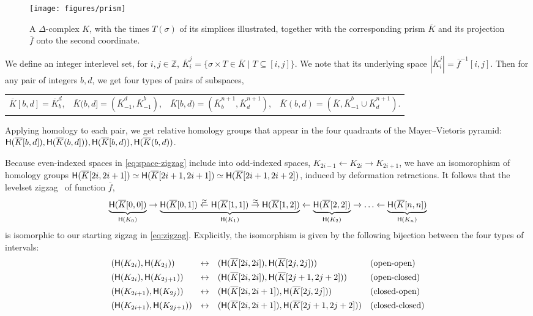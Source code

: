 \documentclass[cleveref,a4paper,english,nolineno]{socg-lipics-v2021}
\newcommand{\Zsp}{\mathbb{Z}}
\newcommand{\ot}{\leftarrow}
\newcommand{\Hgr}{{\sf H}}
\newcommand{\prism}[1]{\overline{#1}}
\newcommand{\pK}{\prism{K}}
\newcommand{\pf}{\prism{f}}
\newcommand{\ssx}{\sigma}
\begin{document}
\begin{figure}
    \centering
    \texttt{[image: figures/prism]}
    \caption{A $\Delta$-complex $K$, with the times $T(\ssx)$ of its simplices
             illustrated, together with the corresponding prism $\pK$ and its
             projection $\pf$ onto the second coordinate.}
    \label{fig:prism}
\end{figure}

We define an integer interlevel set, for $i,j \in \Zsp$,
$
    \pK_i^j = \{ \ssx \times T \in \pK \mid T \subseteq [i, j] \}.
$
We note that its underlying space $|\pK_i^j| = \pf^{-1}[i,j]$.
Then for any pair of integers $b,d$, we get four types of pairs of subspaces,

\hspace{-4ex}
\begin{tabular}{llll}
    $\pK[b,d] = \pK_b^d$,                    &
    $\pK(b,d] = (\pK_{-1}^d, \pK_{-1}^b)$,   &
    $\pK[b,d) = (\pK_b^{n+1}, \pK_d^{n+1})$, &
    $\pK(b,d) = (\pK, \pK_{-1}^b \cup \pK_d^{n+1})$.
\end{tabular}
Applying homology to each pair, we get relative homology groups that
appear in the four quadrants of the Mayer--Vietoris pyramid:
$\Hgr(\pK[b,d]), \Hgr(\pK(b,d])), \Hgr(\pK[b,d)), \Hgr(\pK(b,d))$.

Because even-indexed spaces in \cref{eq:space-zigzag} include into odd-indexed
spaces,
$K_{2i-1} \ot K_{2i} \to K_{2i+1}$, we have an isomorophism of
homology groups $\Hgr(\pK[2i,2i+1]) \simeq \Hgr(\pK[2i+1,2i+1]) \simeq
\Hgr(\pK[2i+1,2i+2])$, induced by deformation retractions.
It follows that the levelset zigzag~\cite{CdSM09} of function $\pf$,
\[
    \underbrace{\Hgr(\pK[0,0])}_{\Hgr(K_0)} \to
    \underbrace{\Hgr(\pK[0,1]) \stackrel{\simeq}{\ot} \Hgr(\pK[1,1]) \stackrel{\simeq}{\to} \Hgr(\pK[1,2])}_{\Hgr(K_1)} \ot
    \underbrace{\Hgr(\pK[2,2])}_{\Hgr(K_2)} \to
    \ldots \ot
    \underbrace{\Hgr(\pK[n,n])}_{\Hgr(K_n)}
\]
is isomorphic to our starting zigzag in \cref{eq:zigzag}.
Explicitly, the isomorphism is given by the following bijection between the four
types of intervals:
\begin{align*}
    & (\Hgr(K_{2i}),   \Hgr(K_{2j}))   & \leftrightarrow &&& (\Hgr(\pK[2i,2i]),   \Hgr(\pK[2j,2j]))         && \text{(open-open)}\\
    & (\Hgr(K_{2i}),   \Hgr(K_{2j+1})) & \leftrightarrow &&& (\Hgr(\pK[2i,2i]),   \Hgr(\pK[2j+1,2j+2]))     && \text{(open-closed)}\\
    & (\Hgr(K_{2i+1}), \Hgr(K_{2j}))   & \leftrightarrow &&& (\Hgr(\pK[2i,2i+1]), \Hgr(\pK[2j,2j]))         && \text{(closed-open)}\\
    & (\Hgr(K_{2i+1}), \Hgr(K_{2j+1})) & \leftrightarrow &&& (\Hgr(\pK[2i,2i+1]), \Hgr(\pK[2j+1,2j+2]))     && \text{(closed-closed)}
\end{align*}
\end{document}
